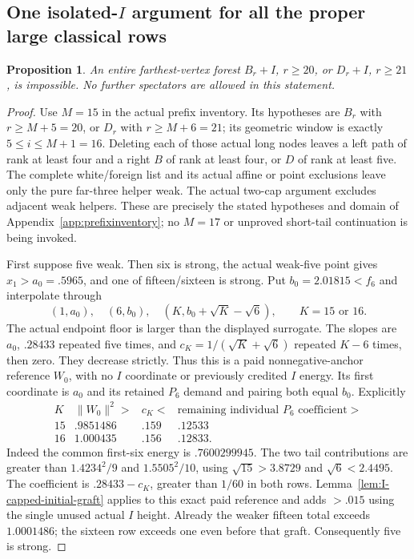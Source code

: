 \documentclass[11pt]{article}
\newtheorem{proposition}[theorem]{Proposition}
\theoremstyle{definition}
\theoremstyle{remark}
\newcommand{\norm}[1]{\lVert #1\rVert}
\begin{document}
\subsection[One isolated-I argument for all the proper large classical rows]{One isolated-$I$ argument for all the proper large classical rows}
\label{app:tail:classicalI}
\begin{proposition}
\label{app:tail:prop:classicalI}
An entire farthest-vertex forest $B_r+I$, $r\ge20$, or $D_r+I$,
$r\ge21$, is impossible. No further spectators are allowed in this
statement.
\end{proposition}
\begin{proof}
Use $M=15$ in the actual prefix inventory. Its hypotheses are
$B_r$ with $r\ge M+5=20$, or $D_r$ with $r\ge M+6=21$;
its geometric window is exactly $5\le i\le M+1=16$.
Deleting each of those actual long nodes leaves a left path of
rank at least four and a right $B$ of rank at least four, or $D$
of rank at least five. The complete white/foreign list and its
actual affine or point exclusions leave only the pure far-three
helper weak. The actual two-cap argument excludes adjacent weak
helpers. These are precisely the stated hypotheses and domain of
Appendix~\ref{app:prefixinventory}; no $M=17$ or unproved short-tail
continuation is being invoked.

First suppose five weak. Then six is strong, the actual weak-five
point gives $x_1>a_0=.5965$, and one of fifteen/sixteen is strong.
Put $b_0=2.01815<f_6$ and interpolate through
\[
 (1,a_0),\quad(6,b_0),\quad
 (K,b_0+\sqrt K-\sqrt6),\qquad K=15\text{ or }16.
\]
The actual endpoint floor is larger than the displayed surrogate.
The slopes are $a_0$, $.28433$ repeated five times, and
$c_K=1/(\sqrt K+\sqrt6)$ repeated $K-6$ times, then zero.
They decrease strictly. Thus this is a paid nonnegative-anchor
reference $W_0$, with no $I$ coordinate or previously credited
$I$ energy. Its first coordinate is $a_0$ and its retained
$P_6$ demand and pairing both equal $b_0$. Explicitly
\[
\begin{array}{c|c|c|c}
K&\norm{W_0}^2>&c_K<&
 \text{remaining individual }P_6\text{ coefficient}>\\\hline
15&.9851486&.159&.12533\\
16&1.000435&.156&.12833 .
\end{array}
\]
Indeed the common first-six energy is $.7600299945$.
The two tail contributions are greater than $1.4234^2/9$ and
$1.5505^2/10$, using $\sqrt{15}>3.8729$ and $\sqrt6<2.4495$.
The coefficient is $.28433-c_K$, greater than $1/60$ in both rows.
Lemma~\ref{lem:I-capped-initial-graft} applies to this exact paid
reference and adds $>.015$ using the single unused actual $I$ height.
Already the weaker fifteen total exceeds $1.0001486$; the sixteen
row exceeds one even before that graft. Consequently five is strong.


\end{proof}
\end{document}
